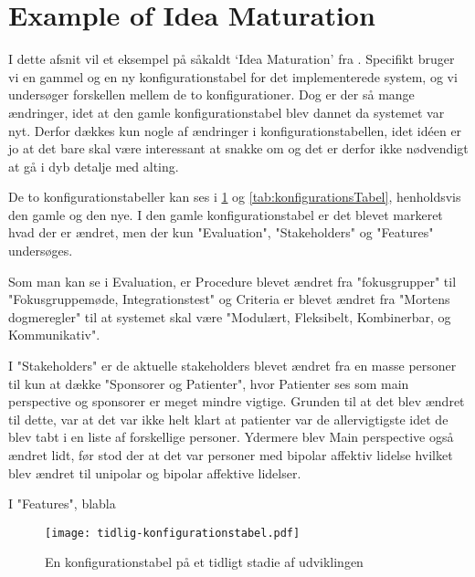 \section{Example of Idea Maturation}
I dette afsnit vil et eksempel på såkaldt `Idea Maturation' fra \citet[Kapitel 23]{art:essence}.
Specifikt bruger vi en gammel og en ny konfigurationstabel for det implementerede system, og vi undersøger forskellen mellem de to konfigurationer.
Dog er der så mange ændringer, idet at den gamle konfigurationstabel blev dannet da systemet var nyt. 
Derfor dækkes kun nogle af ændringer i konfigurationstabellen, idet idéen er jo at det bare skal være interessant at snakke om og det er derfor ikke nødvendigt at gå i dyb detalje med alting.

De to konfigurationstabeller kan ses i \cref{tab:tidligKonfigurationsTabel} og \cref{tab:konfigurationsTabel}, henholdsvis den gamle og den nye. 
I den gamle konfigurationstabel er det blevet markeret hvad der er ændret, men der kun "Evaluation", "Stakeholders" og "Features" undersøges. 

Som man kan se i Evaluation, er Procedure blevet ændret fra "fokusgrupper" til "Fokusgruppemøde, Integrationstest" og Criteria er blevet ændret fra "Mortens dogmeregler" til at systemet skal være "Modulært, Fleksibelt, Kombinerbar, og Kommunikativ". 

I "Stakeholders" er de aktuelle stakeholders blevet ændret fra en masse personer til kun at dække "Sponsorer og Patienter", hvor Patienter ses som main perspective og sponsorer er meget mindre vigtige. Grunden til at det blev ændret til dette, var at det var ikke helt klart at patienter var de allervigtigste idet de blev tabt i en liste af forskellige personer.
Ydermere blev Main perspective også ændret lidt, før stod der at det var personer med bipolar affektiv lidelse hvilket blev ændret til unipolar og bipolar affektive lidelser. 

I "Features", blabla

\begin{figure}
	\texttt{[image: tidlig-konfigurationstabel.pdf]}
	\caption{En konfigurationstabel på et tidligt stadie af udviklingen}
	\label{tab:tidligKonfigurationsTabel}
\end{figure}